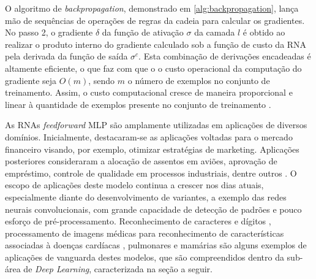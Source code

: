 O algoritmo de \emph{backpropagation}, demonstrado em \ref{alg:backpropagation}, lança mão de sequências de operações de regras da cadeia para calcular os gradientes. No passo 2, o gradiente $\delta$ da função de ativação $\sigma$ da camada $l$ é obtido ao realizar o produto interno do gradiente calculado sob a função de custo da RNA pela derivada da função de saída $\sigma^c$. Esta combinação de derivações encadeadas é altamente eficiente, o que faz com que o o custo operacional da computação do gradiente seja $O(m)$, sendo $m$ o número de exemplos no conjunto de treinamento. Assim, o custo computacional cresce de maneira proporcional e linear à quantidade de exemplos presente no conjunto de treinamento \cite{haykin2009neural, goodfellow2016deep}.

As RNAs \emph{feedforward} MLP são amplamente utilizadas em aplicações de diversos domínios. Inicialmente, destacaram-se as aplicações voltadas para o mercado financeiro visando, por exemplo, otimizar estratégias de marketing. Aplicações posteriores consideraram a alocação de assentos em aviões, aprovação de empréstimo, controle de qualidade em processos industriais, dentre outros \cite{widrow1994neural}. O escopo de aplicações deste modelo continua a crescer nos dias atuais, especialmente diante do desenvolvimento de variantes, a exemplo das redes neurais convolucionais, com grande capacidade de detecção de padrões e pouco esforço de pré-processamento. Reconhecimento de caracteres e dígitos  \cite{lenet}, processamento de imagens médicas para reconhecimento de características associadas à doenças cardíacas \cite{oktay2018anatomically}, pulmonares \cite{mingchen2018holistic} e mamárias \cite{dubrovina2018mammography} são alguns exemplos de aplicações de vanguarda destes modelos, que são compreendidos dentro da sub-área de \emph{Deep Learning}, caracterizada na seção a seguir.

